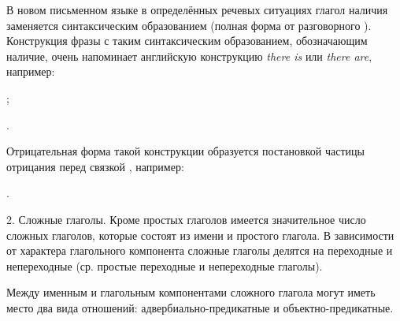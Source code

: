 В новом письменном языке в определённых речевых ситуациях глагол наличия  заменяется синтаксическим образованием  (полная форма от разговорного ). Конструкция фразы с таким синтаксическим образованием, обозначающим наличие, очень напоминает английскую конструкцию \emph{there is} или \emph{there are}, например:
\begin{prfsample}
	\item {};
	\item {}.
\end{prfsample}
Отрицательная форма такой конструкции образуется постановкой частицы отрицания перед связкой , например:
\begin{prfsample}
	\item {}.
\end{prfsample}

2. Сложные глаголы. Кроме простых глаголов имеется значительное число сложных глаголов, которые состоят из имени и простого глагола. В зависимости от характера глагольного компонента сложные глаголы делятся на переходные и непереходные (ср. простые переходные и непереходные глаголы).

Между именным и глагольным ком\-по\-нен\-та\-ми сложного глагола могут иметь место два вида отношений: адвер\-би\-аль\-но-пре\-ди\-кат\-ные и объект\-но-пре\-ди\-кат\-ные.

